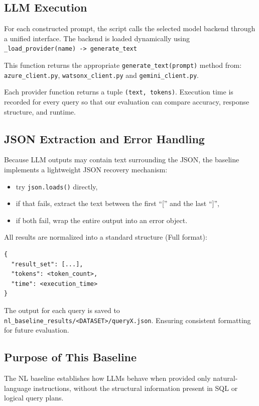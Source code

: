 \documentclass[12pt]{article}
\begin{document}
\subsection{LLM Execution}

For each constructed prompt, the script calls the selected model backend through a unified interface.  
The backend is loaded dynamically using \verb|_load_provider(name) -> generate_text|


This function returns the appropriate \verb|generate_text(prompt)| method from: \texttt{azure\_client.py}, \texttt{watsonx\_client.py} and \texttt {gemini\_client.py}.

Each provider function returns a tuple \verb|(text, tokens)|. Execution time is recorded for every query so that our evaluation can compare accuracy, response structure, and runtime.


\subsection{JSON Extraction and Error Handling}

Because LLM outputs may contain text surrounding the JSON, the baseline implements a lightweight JSON recovery mechanism:
\begin{itemize}
    \item try \verb|json.loads()| directly,
    \item if that fails, extract the text between the first ``['' and the last ``]'',
    \item if both fail, wrap the entire output into an error object.
\end{itemize}

All results are normalized into a standard structure (Full format):

\begin{verbatim}
{
  "result_set": [...],
  "tokens": <token_count>,
  "time": <execution_time>
}
\end{verbatim}

The output for each query is saved to \verb|nl_baseline_results/<DATASET>/queryX.json|.
Ensuring consistent formatting for future evaluation.

\subsection{Purpose of This Baseline}

The NL baseline establishes how LLMs behave when provided only natural-language instructions, without the structural information present in SQL or logical query plans.
\end{document}
